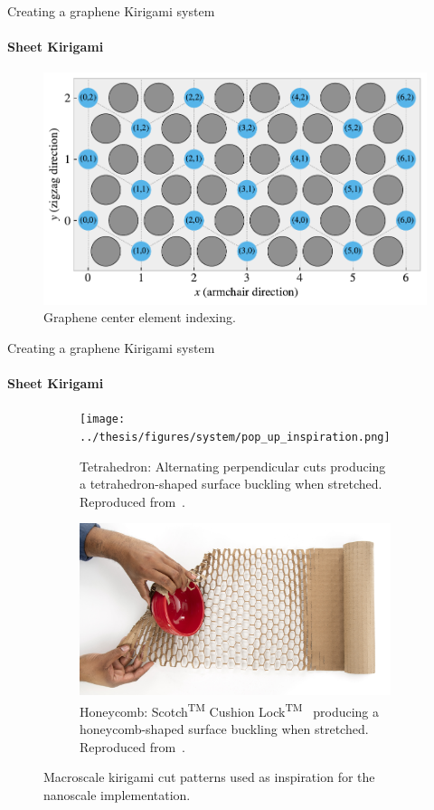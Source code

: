 \documentclass[
	10pt, %
]{beamer}
\begin{document}
%
%
\begin{frame}{Creating a graphene Kirigami system}
	\framesubtitle{Sheet Kirigami}
	\begin{figure}[H]
		\centering
		\includegraphics[width=0.7\linewidth]{../thesis/figures/system/center_indexing.pdf}
		\caption{Graphene center element indexing.}
	\end{figure}	
\end{frame}
%
%
\begin{frame}{Creating a graphene Kirigami system}
	\framesubtitle{Sheet Kirigami}
	\begin{figure}[H]
		\centering
		\begin{subfigure}[t]{0.48\textwidth}
			\centering
			\texttt{[image: ../thesis/figures/system/pop\_up\_inspiration.png]}
			\caption{Tetrahedron: Alternating perpendicular cuts producing a tetrahedron-shaped surface buckling when stretched. Reproduced from~\cite{new_pop_up}. }
		\end{subfigure}
		\hfill
		\begin{subfigure}[t]{0.48\textwidth}
			\centering
			\includegraphics[width=\textwidth]{../thesis/figures/system/honeycomb_inspiration.jpg}
			\caption{Honeycomb: Scotch\textsuperscript{TM} Cushion Lock\textsuperscript{TM}~\cite{cushion_wrap} producing a honeycomb-shaped surface buckling when stretched. Reproduced from~\cite{cushion_wrap}.}
		\end{subfigure}
		\hfill
		\caption{Macroscale kirigami cut patterns used as inspiration for the nanoscale implementation.}
	  \end{figure}
\end{frame}
\end{document}
